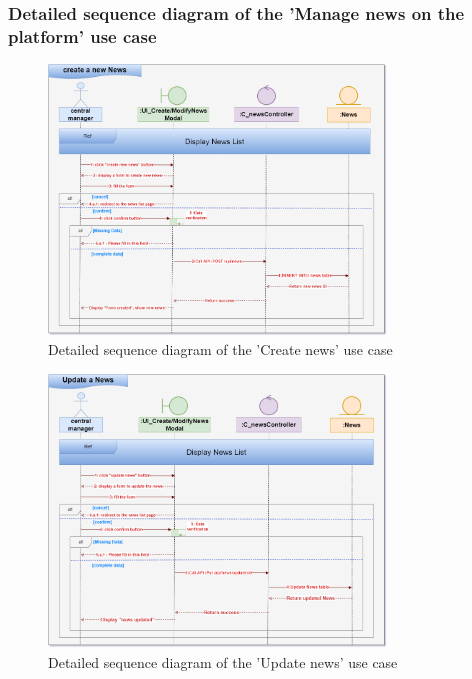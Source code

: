 \subsubsection{Detailed sequence diagram of the 'Manage news on the platform' use case}
\begin{figure}[h!]
    \centering
    \includegraphics[width=0.8\textwidth]{figures/det create a news.png}
    \caption{Detailed sequence diagram of the 'Create news' use case}
\end{figure}
\begin{figure}[h!]
    \centering
    \includegraphics[width=0.8\textwidth]{figures/det update a news.png}
    \caption{Detailed sequence diagram of the 'Update news' use case}
\end{figure}
\clearpage
